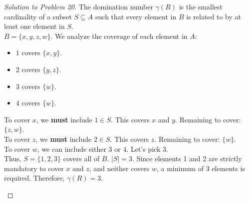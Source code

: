 \documentclass[11pt, letterpaper]{article}
\theoremstyle{definition}
\theoremstyle{remark}
\begin{document}
\begin{proof}[Solution to Problem 20]
The domination number $\gamma(R)$ is the smallest cardinality of a subset $S \subseteq A$ such that every element in $B$ is related to by at least one element in $S$. \\
$B = \{x, y, z, w\}$. We analyze the coverage of each element in $A$:
\begin{itemize}
    \item $1$ covers $\{x, y\}$.
    \item $2$ covers $\{y, z\}$.
    \item $3$ covers $\{w\}$.
    \item $4$ covers $\{w\}$.
\end{itemize}
To cover $x$, we \textbf{must} include $1 \in S$. This covers $x$ and $y$. Remaining to cover: $\{z, w\}$. \\
To cover $z$, we \textbf{must} include $2 \in S$. This covers $z$. Remaining to cover: $\{w\}$. \\
To cover $w$, we can include either $3$ or $4$. Let's pick $3$. \\
Thus, $S = \{1, 2, 3\}$ covers all of $B$. $|S| = 3$. Since elements 1 and 2 are strictly mandatory to cover $x$ and $z$, and neither covers $w$, a minimum of 3 elements is required. Therefore, $\gamma(R) = 3$.

\begin{center}
\end{center}
\end{proof}
\end{document}
